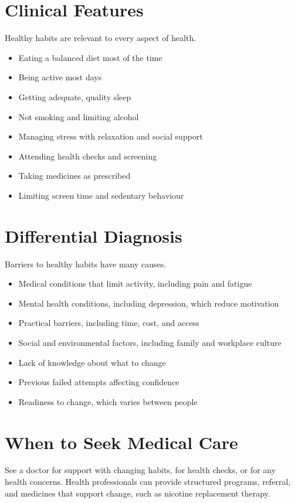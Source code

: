 \section*{Clinical Features}
Healthy habits are relevant to every aspect of health.

\begin{itemize}
    \item Eating a balanced diet most of the time
    \item Being active most days
    \item Getting adequate, quality sleep
    \item Not smoking and limiting alcohol
    \item Managing stress with relaxation and social support
    \item Attending health checks and screening
    \item Taking medicines as prescribed
    \item Limiting screen time and sedentary behaviour
\end{itemize}

\section*{Differential Diagnosis}
Barriers to healthy habits have many causes.

\begin{itemize}
    \item Medical conditions that limit activity, including pain and fatigue
    \item Mental health conditions, including depression, which reduce motivation
    \item Practical barriers, including time, cost, and access
    \item Social and environmental factors, including family and workplace culture
    \item Lack of knowledge about what to change
    \item Previous failed attempts affecting confidence
    \item Readiness to change, which varies between people
\end{itemize}

\section*{When to Seek Medical Care}
See a doctor for support with changing habits, for health checks, or for any health concerns. Health professionals can provide structured programs, referral, and medicines that support change, such as nicotine replacement therapy.

